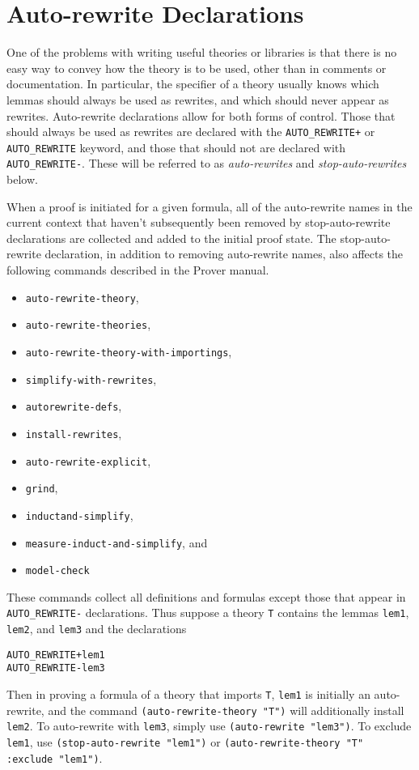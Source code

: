 
\section{Auto-rewrite Declarations}
\label{auto-rewrite-decls}

One of the problems with writing useful theories or libraries is that
there is no easy way to convey how the theory is to be used, other than in
comments or documentation.  In particular, the specifier of a theory
usually knows which lemmas should always be used as rewrites, and which
should never appear as rewrites.  Auto-rewrite declarations allow for both
forms of control.  Those that should always be used as rewrites are
declared with the \texttt{AUTO\_REWRITE+} or \texttt{AUTO\_REWRITE}
keyword, and those that should not are declared with
\texttt{AUTO\_REWRITE-}.  These will be referred to as
\emph{auto-rewrites} and \emph{stop-auto-rewrites} below.

When a proof is initiated for a given formula, all of the auto-rewrite
names in the current context that haven't subsequently been removed by
stop-auto-rewrite declarations are collected and added to the initial proof
state.  The stop-auto-rewrite declaration, in addition to removing
auto-rewrite names, also affects the following commands described in the
Prover manual.
\begin{itemize}
\setlength{\itemsep}{-5pt}
\item \texttt{auto-rewrite-theory},
\item \texttt{auto-rewrite-theories},
\item \texttt{auto-rewrite-theory-with-importings},
\item \texttt{simplify-with-rewrites},
\item \texttt{auto\-rewrite-defs},
\item \texttt{install-rewrites},
\item \texttt{auto-rewrite-explicit},
\item \texttt{grind},
\item \texttt{induct\-and-simplify},
\item \texttt{measure-induct-and-simplify}, and
\item \texttt{model-check}
\end{itemize}
These commands collect all definitions and formulas except those that
appear in \texttt{AUTO\_\-REWRITE-} declarations.  Thus suppose a theory
\texttt{T} contains the lemmas \texttt{lem1}, \texttt{lem2}, and
\texttt{lem3} and the declarations
\begin{alltt}
  AUTO_REWRITE+ lem1
  AUTO_REWRITE- lem3
\end{alltt}
Then in proving a formula of a theory that imports \texttt{T},
\texttt{lem1} is initially an auto-rewrite, and the command
\texttt{(auto-rewrite-theory "T")} will additionally install
\texttt{lem2}.  To auto-rewrite with \texttt{lem3}, simply use
\texttt{(auto-rewrite "lem3")}.  To exclude \texttt{lem1}, use
\texttt{(stop-auto-rewrite "lem1")} or \texttt{(auto-rewrite-theory "T"
:exclude "lem1")}.

